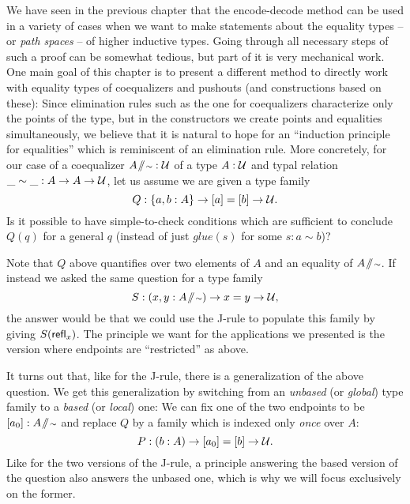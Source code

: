 We have seen in the previous chapter that the encode-decode method can be used
in a variety of cases when we want to make statements about the equality
types -- or \emph{path spaces} -- of higher inductive types.
Going through all necessary steps of such a proof can be somewhat tedious, but
part of it is very mechanical work.
One main goal of this chapter is to present a different method to
directly work with equality types of coequalizers and pushouts
(and constructions based on these):
Since elimination rules such as the one for coequalizers characterize only
the points  of the type, but in the constructors we create points
and equalities simultaneously, we believe that it is natural to hope for
an ``induction principle for equalities'' which is reminiscent of an elimination
rule.
More concretely, for our case of a coequalizer $A \! \sslash \! {\scriptstyle \sim} : \mathcal{U}$ of a type $A : \mathcal{U}$
and typal relation $\_\sim\_ : A \to A \to \mathcal{U}$,
let us assume we are given a type family
\begin{equation*}
Q: \{a, b : A\} \to [a] = [b] \to \mathcal{U} \text{.}
\end{equation*}
Is it possible to have simple-to-check conditions which are sufficient to
conclude $Q(q)$ for a general $q$ (instead of just $glue(s)$ for some $s : a \sim b$)?

\begin{remark}
Note that $Q$ above quantifies over two elements of $A$ and an equality of $A \! \sslash \! {\scriptstyle \sim}$.
If instead we asked the same question for a type family
\begin{equation*}
S: (x, y : A \! \sslash \! {\scriptstyle \sim}) \to x = y \to \mathcal{U} \text{,}
\end{equation*}
the answer would be that we could use the J-rule to populate this family by giving
$S(\mathsf{refl}_x)$.
The principle we want for the applications we presented is the version
where endpoints are ``restricted'' as above.
\end{remark}

It turns out that, like for the J-rule, there is a generalization of the above question.
We get this generalization by switching from an \emph{unbased} (or \emph{global}) type family
to a \emph{based} (or \emph{local}) one:
We can fix one of the two endpoints to be $[a_0] : A \! \sslash \! {\scriptstyle \sim}$ and replace $Q$
by a family which is indexed only \emph{once} over $A$:
\begin{equation}
P : (b : A) \to [a_0] = [b] \to \mathcal{U} \text{.}
\end{equation}
Like for the two versions of the J-rule, a principle answering the based version
of the question also answers the unbased one, which is why we will focus
exclusively on the former.

